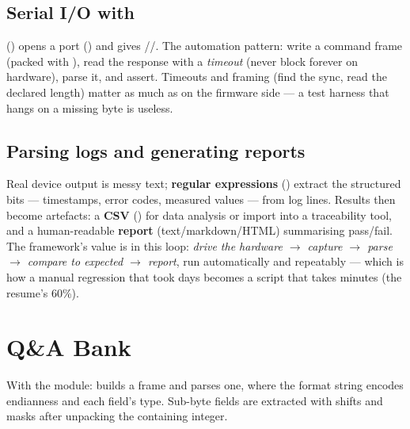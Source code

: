 \subsection{Serial I/O with }

 () opens a port
() and gives
//. The automation pattern: write a
command frame (packed with ), read the response with a
\emph{timeout} (never block forever on hardware), parse it, and assert. Timeouts
and framing (find the sync, read the declared length) matter as much as on the
firmware side --- a test harness that hangs on a missing byte is useless.

\subsection{Parsing logs and generating reports}

Real device output is messy text; \textbf{regular expressions}
() extract the structured bits --- timestamps, error codes,
measured values --- from log lines. Results then become artefacts: a
\textbf{CSV} () for data analysis or import into a traceability
tool, and a human-readable \textbf{report} (text/markdown/HTML) summarising
pass/fail. The framework's value is in this loop: \emph{drive the hardware
$\rightarrow$ capture $\rightarrow$ parse $\rightarrow$ compare to expected
$\rightarrow$ report}, run automatically and repeatably --- which is how a manual
regression that took days becomes a script that takes minutes (the resume's
60\%).

\section{Q\&A Bank}


With the  module:  builds a
 frame and  parses one, where the
format string encodes endianness and each field's type. Sub-byte fields are
extracted with shifts and masks after unpacking the containing integer.

